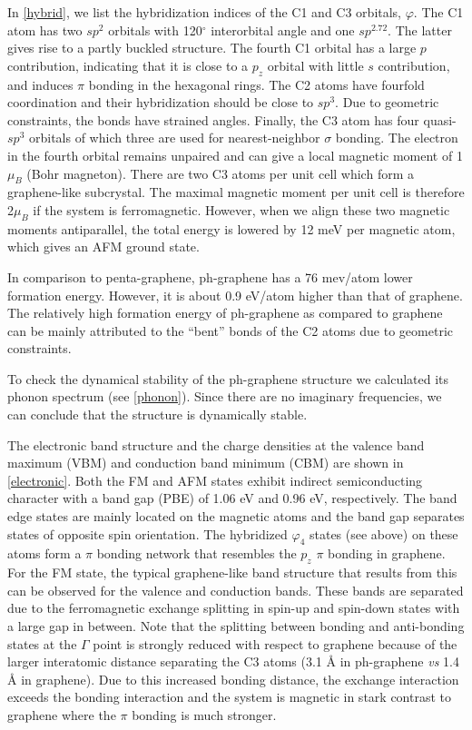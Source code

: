 In \autoref{hybrid}, we list the hybridization indices of the C1 and C3 orbitals, $\varphi$.  The C1 atom has two $sp^2$ orbitals with 120$^{\circ}$ interorbital angle and one $sp^{2.72}$. The latter gives rise to a partly buckled structure. The fourth C1 orbital has a large $p$ contribution, indicating that it is close to a $p_z$ orbital with little $s$ contribution, and induces $\pi$ bonding in the hexagonal rings. The C2 atoms have fourfold coordination and their hybridization should be close to $sp^3$. Due to geometric constraints, the bonds have strained angles\cite{coulson1949}. Finally, the C3 atom has four quasi-$sp^3$ orbitals of which three are used for nearest-neighbor $\sigma$ bonding. The electron in the fourth orbital remains unpaired and can give a local magnetic moment of 1 $\mu_B$ (Bohr magneton). There are two C3 atoms per unit cell which form a graphene-like subcrystal. The maximal magnetic moment per unit cell is therefore  2$\mu_B$ if the system is ferromagnetic. However, when we align these two magnetic moments antiparallel, the total energy is lowered by 12 meV per magnetic atom, which gives an AFM ground state. 

In comparison to penta-graphene, ph-graphene has a 76 mev/atom lower formation energy. However, it is about 0.9 eV/atom higher than that of graphene. The relatively high formation energy of ph-graphene as compared to graphene can be mainly attributed to the ``bent'' bonds of the C2 atoms due to geometric constraints. 

To check the dynamical stability of the ph-graphene structure we calculated its phonon spectrum (see \autoref{phonon}). Since there are no imaginary frequencies, we can conclude that the structure is dynamically stable.

The electronic band structure and the charge densities at the valence band maximum (VBM) and conduction band minimum (CBM) are shown in \autoref{electronic}. Both the FM and AFM states exhibit indirect semiconducting character with a band gap (PBE) of 1.06 eV and 0.96 eV, respectively. The band edge states are mainly located on the magnetic atoms and the band gap separates states of opposite spin orientation. The hybridized $\varphi_4$ states (see above) on these atoms form a $\pi$ bonding network that resembles the $p_z$ $\pi$ bonding in graphene. For the FM state, the typical graphene-like band structure that results from this can be observed for the valence and conduction bands. These bands are separated due to the ferromagnetic exchange splitting in spin-up and spin-down states with a large gap in between. Note that the splitting between bonding and anti-bonding states at the $\Gamma$ point is strongly reduced with respect to graphene because of the larger interatomic distance separating the C3 atoms (3.1 {\AA} in ph-graphene \textit{vs} 1.4 {\AA} in graphene). Due to this increased bonding distance, the exchange interaction exceeds the bonding interaction and the system is magnetic in stark contrast to graphene where the $\pi$ bonding is much stronger.


